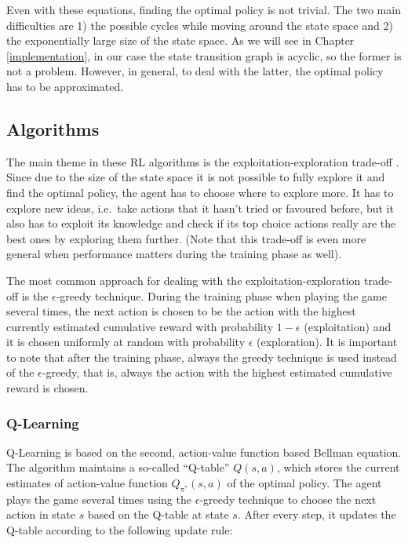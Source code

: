 Even with these equations, finding the optimal policy is not trivial. The two main difficulties are 1) the possible cycles while moving around the state space and 2) the exponentially large size of the state space. As we will see in Chapter \ref{implementation}, in our case the state transition graph is acyclic, so the former is not a problem. However, in general, to deal with the latter, the optimal policy has to be approximated.



\subsection{Algorithms}


The main theme in these RL algorithms is the exploitation-exploration trade-off \cite{kaelbling1996explorationexploitation}. Since due to the size of the state space it is not possible to fully explore it and find the optimal policy, the agent has to choose where to explore more. It has to explore new ideas, i.e.\ take actions that it hasn't tried or favoured before, but it also has to exploit its knowledge and check if its top choice actions really are the best ones by exploring them further. (Note that this trade-off is even more general when performance matters during the training phase as well). 


The most common approach for dealing with the exploitation-exploration trade-off is the $\epsilon$-greedy technique. During the training phase when playing the game several times, the next action is chosen to be the action with the highest currently estimated cumulative reward with probability $1-\epsilon$ (exploitation) and it is chosen uniformly at random with probability $\epsilon$ (exploration). It is important to note that after the training phase, always the greedy technique is used instead of the $\epsilon$-greedy, that is, always the action with the highest estimated cumulative reward is chosen.



\subsubsection{Q-Learning}


Q-Learning \cite{watkins1989qlearning} is based on the second, action-value function based Bellman equation. The algorithm maintains a so-called ``Q-table'' $Q(s,a)$, which stores the current estimates of action-value function $Q_{\pi^*}(s,a)$ of the optimal policy. The agent plays the game several times using the $\epsilon$-greedy technique to choose the next action in state $s$ based on the Q-table at state $s$. After every step, it updates the Q-table according to the following update rule:

